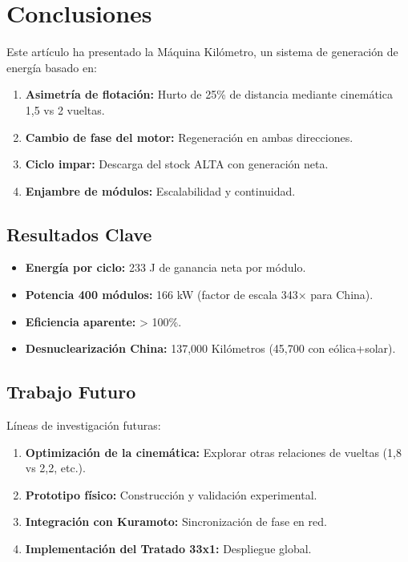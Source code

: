 \documentclass[12pt,a4paper]{article}
\begin{document}
\section{Conclusiones}

Este artículo ha presentado la Máquina Kilómetro, un sistema de generación de energía basado en:

\begin{enumerate}
    \item \textbf{Asimetría de flotación:} Hurto de 25\% de distancia mediante cinemática 1,5 vs 2 vueltas.
    \item \textbf{Cambio de fase del motor:} Regeneración en ambas direcciones.
    \item \textbf{Ciclo impar:} Descarga del stock ALTA con generación neta.
    \item \textbf{Enjambre de módulos:} Escalabilidad y continuidad.
\end{enumerate}

\subsection{Resultados Clave}

\begin{itemize}
    \item \textbf{Energía por ciclo:} 233 J de ganancia neta por módulo.
    \item \textbf{Potencia 400 módulos:} 166 kW (factor de escala 343× para China).
    \item \textbf{Eficiencia aparente:} > 100\%.
    \item \textbf{Desnuclearización China:} 137,000 Kilómetros (45,700 con eólica+solar).
\end{itemize}

\subsection{Trabajo Futuro}

Líneas de investigación futuras:

\begin{enumerate}
    \item \textbf{Optimización de la cinemática:} Explorar otras relaciones de vueltas (1,8 vs 2,2, etc.).
    \item \textbf{Prototipo físico:} Construcción y validación experimental.
    \item \textbf{Integración con Kuramoto:} Sincronización de fase en red.
    \item \textbf{Implementación del Tratado 33x1:} Despliegue global.
\end{enumerate}
\end{document}
